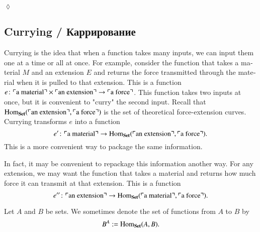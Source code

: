 \documentclass{book}
\def\tn{\textnormal}
\def\Hom{\tn{Hom}}
\def\to{\rightarrow}
\def\taking{\colon}
\newcommand{\fakebox}[1]{\tn{$\ulcorner$#1$\urcorner$}}
\def\Set{{\bf Set}}
\theoremstyle{theoremENG}
\theoremstyle{lemmaENG}
\theoremstyle{propositionENG}
\theoremstyle{corollaryENG}
\theoremstyle{factENG}
\theoremstyle{remarkENG}
\theoremstyle{exampleENG}
\theoremstyle{warningENG}
\theoremstyle{questionENG}
\theoremstyle{guessENG}
\theoremstyle{answerENG}
\theoremstyle{constructionENG}
\theoremstyle{rulesENG}
\theoremstyle{excENG}
\newtheorem{excENG}[subsubsection]{\begin{english}Exercise\end{english}}
\theoremstyle{appENG}
\theoremstyle{definitionENG}
\theoremstyle{notationENG}
\newtheorem{notationENG}[subsubsection]{\begin{english}Notation\end{english}}
\theoremstyle{conjectureENG}
\theoremstyle{postulateENG}
\newenvironment{exerciseENG}{\begin{excENG}}{\hspace*{\fill}$\lozenge$\end{excENG}}
\theoremstyle{theoremRUS}
\theoremstyle{lemmaRUS}
\theoremstyle{propositionRUS}
\theoremstyle{corollaryRUS}
\theoremstyle{factRUS}
\theoremstyle{remarkRUS}
\theoremstyle{exampleRUS}
\theoremstyle{warningRUS}
\theoremstyle{questionRUS}
\theoremstyle{guessRUS}
\theoremstyle{answerRUS}
\theoremstyle{constructionRUS}
\theoremstyle{rulesRUS}
\theoremstyle{excRUS}
\theoremstyle{appRUS}
\theoremstyle{definitionRUS}
\theoremstyle{notationRUS}
\theoremstyle{conjectureRUS}
\theoremstyle{postulateRUS}
\begin{document}
\begin{english}
\begin{exerciseENG}
\begin{russian} \end{russian}

\end{exerciseENG}


\subsection{Currying / Каррирование}\label{sec:currying}

Currying is the idea that when a function takes many inputs, we can input them one at a time or all at once. For example, consider the function that takes a material $M$ and an extension $E$ and returns the force transmitted through the material when it is pulled to that extension. This is a function $e\taking \fakebox{a material}\times\fakebox{an extension}\to\fakebox{a force}$. This function takes two inputs at once, but it is convenient to "curry" the second input. Recall that $\Hom_\Set(\fakebox{an extension},\fakebox{a force})$ is the set of theoretical force-extension curves. Currying transforms $e$ into a function $$e'\taking\fakebox{a material}\to\Hom_\Set(\fakebox{an extension},\fakebox{a force}).$$ This is a more convenient way to package the same information. 

\begin{russian} \end{russian}

In fact, it may be convenient to repackage this information another way. For any extension, we may want the function that takes a material and returns how much force it can transmit at that extension. This is a function $$e''\taking\fakebox{an extension}\to\Hom_\Set(\fakebox{a material},\fakebox{a force}).$$ 

\begin{russian} \end{russian}

\begin{notationENG}\index{exponentials ! in $\Set$}

Let $A$ and $B$ be sets. We sometimes denote the set of functions from $A$ to $B$ by 
\begin{align}\label{dia:exponential sets}
B^A:=\Hom_\Set(A,B).
\end{align}

\begin{russian} \end{russian}


\end{notationENG}
\end{english}
\end{document}
